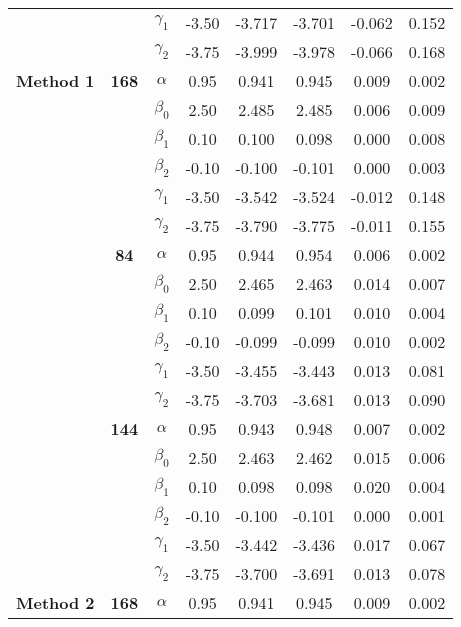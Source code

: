 \begin{table}[h]
\begin{tabular}[t]{>{}c>{}ccccccc}
 &  & $\gamma_1$ & -3.50 & -3.717 & -3.701 & -0.062 & 0.152\\

 &  & $\gamma_2$ & -3.75 & -3.999 & -3.978 & -0.066 & 0.168\\

\multirow{-18}{*}{\centering\arraybackslash \textbf{Method 1}} & \multirow{-6}{*}{\centering\arraybackslash \textbf{168}} & $\alpha$ & 0.95 & 0.941 & 0.945 & 0.009 & 0.002\\
\cmidrule{1-8}
 &  & $\beta_0$ & 2.50 & 2.485 & 2.485 & 0.006 & 0.009\\

 &  & $\beta_1$ & 0.10 & 0.100 & 0.098 & 0.000 & 0.008\\

 &  & $\beta_2$ & -0.10 & -0.100 & -0.101 & 0.000 & 0.003\\

 &  & $\gamma_1$ & -3.50 & -3.542 & -3.524 & -0.012 & 0.148\\

 &  & $\gamma_2$ & -3.75 & -3.790 & -3.775 & -0.011 & 0.155\\

 & \multirow{-6}{*}{\centering\arraybackslash \textbf{84}} & $\alpha$ & 0.95 & 0.944 & 0.954 & 0.006 & 0.002\\

 &  & $\beta_0$ & 2.50 & 2.465 & 2.463 & 0.014 & 0.007\\

 &  & $\beta_1$ & 0.10 & 0.099 & 0.101 & 0.010 & 0.004\\

 &  & $\beta_2$ & -0.10 & -0.099 & -0.099 & 0.010 & 0.002\\

 &  & $\gamma_1$ & -3.50 & -3.455 & -3.443 & 0.013 & 0.081\\

 &  & $\gamma_2$ & -3.75 & -3.703 & -3.681 & 0.013 & 0.090\\

 & \multirow{-6}{*}{\centering\arraybackslash \textbf{144}} & $\alpha$ & 0.95 & 0.943 & 0.948 & 0.007 & 0.002\\

 &  & $\beta_0$ & 2.50 & 2.463 & 2.462 & 0.015 & 0.006\\

 &  & $\beta_1$ & 0.10 & 0.098 & 0.098 & 0.020 & 0.004\\

 &  & $\beta_2$ & -0.10 & -0.100 & -0.101 & 0.000 & 0.001\\

 &  & $\gamma_1$ & -3.50 & -3.442 & -3.436 & 0.017 & 0.067\\

 &  & $\gamma_2$ & -3.75 & -3.700 & -3.691 & 0.013 & 0.078\\

\multirow{-18}{*}{\centering\arraybackslash \textbf{Method 2}} & \multirow{-6}{*}{\centering\arraybackslash \textbf{168}} & $\alpha$ & 0.95 & 0.941 & 0.945 & 0.009 & 0.002\\
\bottomrule
\end{tabular}
\end{table}
